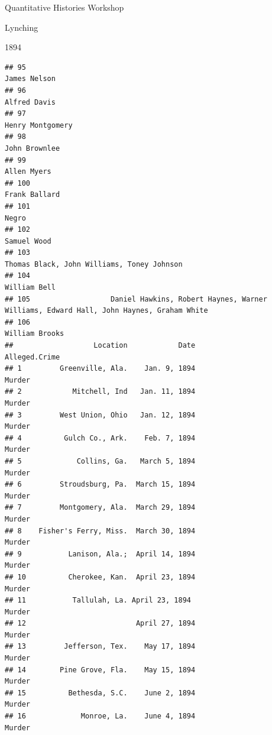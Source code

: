 \documentclass[
  ignorenonframetext,
]{beamer}
\begin{document}
\begin{frame}[fragile]{Quantitative Histories Workshop}
\begin{block}{Lynching}
\begin{block}{1894}
\begin{verbatim}
## 95                                                                                              James Nelson
## 96                                                                                              Alfred Davis
## 97                                                                                          Henry Montgomery
## 98                                                                                             John Brownlee
## 99                                                                                               Allen Myers
## 100                                                                                            Frank Ballard
## 101                                                                                                    Negro
## 102                                                                                              Samuel Wood
## 103                                                               Thomas Black, John Williams, Toney Johnson
## 104                                                                                             William Bell
## 105                   Daniel Hawkins, Robert Haynes, Warner Williams, Edward Hall, John Haynes, Graham White
## 106                                                                                           William Brooks
##                   Location            Date                   Alleged.Crime
## 1         Greenville, Ala.    Jan. 9, 1894                          Murder
## 2            Mitchell, Ind   Jan. 11, 1894                          Murder
## 3         West Union, Ohio   Jan. 12, 1894                          Murder
## 4          Gulch Co., Ark.    Feb. 7, 1894                          Murder
## 5             Collins, Ga.   March 5, 1894                          Murder
## 6         Stroudsburg, Pa.  March 15, 1894                          Murder
## 7         Montgomery, Ala.  March 29, 1894                          Murder
## 8    Fisher's Ferry, Miss.  March 30, 1894                          Murder
## 9           Lanison, Ala.;  April 14, 1894                          Murder
## 10          Cherokee, Kan.  April 23, 1894                          Murder
## 11           Tallulah, La. April 23, 1894                           Murder
## 12                          April 27, 1894                          Murder
## 13         Jefferson, Tex.    May 17, 1894                          Murder
## 14        Pine Grove, Fla.    May 15, 1894                          Murder
## 15          Bethesda, S.C.    June 2, 1894                          Murder
## 16             Monroe, La.    June 4, 1894                          Murder

\end{verbatim}
\end{block}
\end{block}
\end{frame}
\end{document}
